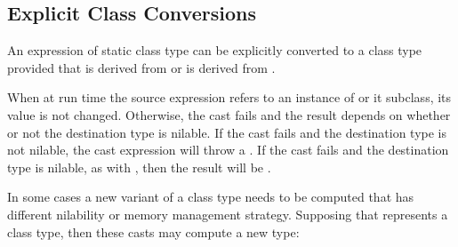 \subsection{Explicit Class Conversions}
\label{Explicit_Class_Conversions}

An expression of static class type  can be explicitly
converted to a class type  provided that  is derived
from  or  is derived from .

When at run time the source expression refers to an instance of 
or it subclass, its value is not changed.  Otherwise, the cast fails and
the result depends on whether or not the destination type is nilable. If
the cast fails and the destination type is not nilable, the cast
expression will throw a . If the cast fails and the
destination type is nilable, as with , then the result will be
.

In some cases a new variant of a class type needs to be computed that has
different nilability or memory management strategy. Supposing that
 represents a class type, then these casts may compute a new type:

